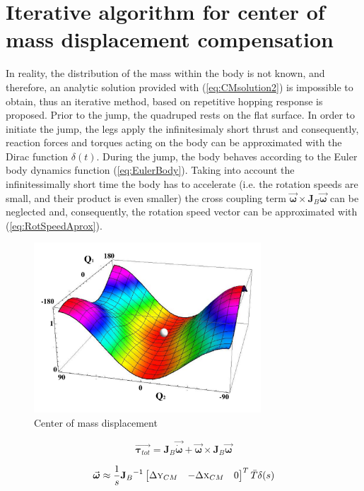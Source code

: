 \section{Iterative algorithm for center of mass displacement compensation}\label{sec:Algorithm}
In reality, the distribution of the mass within the body is not known, and therefore, an analytic solution provided with (\ref{eq:CMsolution2}) is impossible to obtain, thus an iterative method, based on repetitive hopping response is proposed. Prior to the jump, the quadruped rests on the flat surface. In order to initiate the jump, the legs apply the infinitesimaly short thrust and consequently, reaction forces and torques acting on the body can be approximated with the Dirac function $\delta (t)$. During the jump, the body behaves according to the Euler body dynamics function (\ref{eq:EulerBody}). Taking into account the infinitessimally short time the body has to accelerate (i.e. the rotation speeds are small, and their product is even smaller) the cross coupling term $\vec{\boldsymbol{\omega}}\times \textbf{J}_B\vec{\boldsymbol{\omega}}$ can be neglected and, consequently, the rotation speed vector can be approximated with (\ref{eq:RotSpeedAprox}).
\begin{figure}[!t]
	\centering
	\includegraphics[width=85mm]{./pictures/RobinRepicCM.pdf}
	\caption{Center of mass displacement}
	\label{fig:CM3Dfunction}
\end{figure}

\begin{equation}\label{eq:EulerBody}
\vec{\boldsymbol{\tau}_{tot}}=\textbf{J}_B\vec{\dot{\boldsymbol{\omega}}}+\vec{\boldsymbol{\omega}}\times \textbf{J}_B\vec{\boldsymbol{\omega}}
\end{equation}

\begin{equation}\label{eq:RotSpeedAprox}
\vec{\boldsymbol{\omega}}\approx \frac{1}{s}{\textbf{J}_B}^{-1}\begin{bmatrix}
\Delta \textsc{y}_{CM} & -\Delta \textsc{x}_{CM} & 0
\end{bmatrix}^T\bar{T}\delta(s)
\end{equation}

